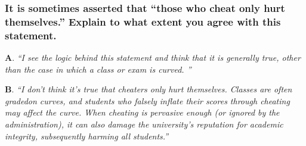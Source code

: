 \documentclass[12pt]{beamer}
\newcommand\ans[1]{{\it ``#1''}}
\newcommand\gap{\vspace{5mm}}
\begin{document}



\begin{frame}   %
\frametitle{It is sometimes asserted that ``those who cheat only hurt themselves.'' Explain to what extent you agree with this statement.}

{\bf A}. \ans{I see the logic behind this statement and think that it is generally true, other than the case in which a class or exam is curved. }

\gap


{\bf B}. \ans{I don’t think it’s true that cheaters only hurt themselves.  Classes are often gradedon  curves,  and  students  who  falsely  inflate  their  scores  through  cheating may affect the curve.  When cheating is pervasive enough (or ignored by the administration), it can also damage the university’s reputation for academic integrity, subsequently harming all students.}

\end{frame}
\end{document}
